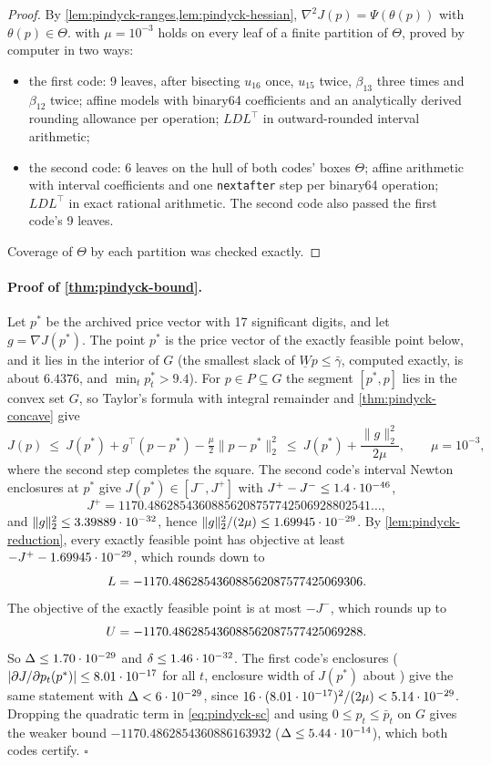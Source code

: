 \begin{proof}
By \cref{lem:pindyck-ranges,lem:pindyck-hessian}, $\nabla^2J(p)=\Psi(\theta(p))$ with $\theta(p)\in\Theta$.
 with $\mu=10^{-3}$ holds on every leaf of a finite partition of $\Theta$, proved by computer in two ways:
\begin{itemize}
\item the first code: 9 leaves, after bisecting $u_{16}$ once, $u_{15}$ twice, $\beta_{13}$ three times and $\beta_{12}$ twice;
affine models with binary64 coefficients and an analytically derived rounding allowance per operation; $LDL^\top$ in outward-rounded interval arithmetic;
\item the second code: 6 leaves on the hull of both codes' boxes $\Theta$;
affine arithmetic with interval coefficients and one \texttt{nextafter} step per binary64 operation; $LDL^\top$ in exact rational arithmetic.
The second code also passed the first code's 9 leaves.
\end{itemize}
Coverage of $\Theta$ by each partition was checked exactly.
\end{proof}

\paragraph{Proof of \cref{thm:pindyck-bound}.}
Let $p^*$ be the archived price vector with 17 significant digits, and let $g=\nabla J(p^*)$.
The point $p^*$ is the price vector of the exactly feasible point below, and it lies in the interior of $G$ (the smallest slack of $\underline Wp\le\bar\gamma$, computed exactly, is about $6.4376$, and $\min_tp^*_t>9.4$).
For $p\in P\subseteq G$ the segment $[p^*,p]$ lies in the convex set $G$, so Taylor's formula with integral remainder and \cref{thm:pindyck-concave} give
\begin{equation}\label{eq:pindyck-sc}
J(p)\ \le\ J(p^*)+g^\top(p-p^*)-\tfrac{\mu}{2}\|p-p^*\|_2^2\ \le\ J(p^*)+\frac{\|g\|_2^2}{2\mu},\qquad\mu=10^{-3},
\end{equation}
where the second step completes the square.
The second code's interval Newton enclosures at $p^*$ give $J(p^*)\in[J^-,J^+]$ with $J^+-J^-\le1.4\cdot 10^{-46}$,
\[
J^+=1170.48628543608856208757742506928802541\ldots,
\]
and $\|g\|_2^2\le3.39889\cdot 10^{-32}$, hence $\|g\|_2^2/(2\mu)\le1.69945\cdot 10^{-29}$.
By \cref{lem:pindyck-reduction}, every exactly feasible point has objective at least $-J^+-1.69945\cdot 10^{-29}$, which rounds down to
\[
L=-1170.486285436088562087577425069306 .
\]
The objective of the exactly feasible point is at most $-J^-$, which rounds up to
\[
U=-1170.486285436088562087577425069288 .
\]
So $\Delta\le1.70\cdot 10^{-29}$ and $\delta\le1.46\cdot 10^{-32}$.
The first code's enclosures ($|\partial J/\partial p_t(p^*)|\le8.01\cdot 10^{-17}$ for all $t$, enclosure width of $J(p^*)$ about ) give the same statement with $\Delta<6\cdot 10^{-29}$, since $16\cdot(8.01\cdot 10^{-17})^2/(2\mu)<5.14\cdot 10^{-29}$.
Dropping the quadratic term in \eqref{eq:pindyck-sc} and using $0\le p_t\le\bar p_t$ on $G$ gives the weaker bound $-1170.4862854360886163932$ ($\Delta\le5.44\cdot 10^{-14}$), which both codes certify.
\hfill$\square$

